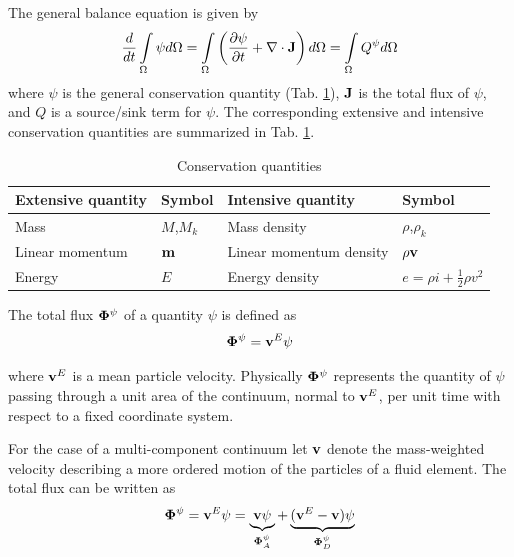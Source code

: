 The general balance equation is given by
%
\begin{eqnarray}
\frac{d}{dt} \int\limits_\Omega \psi d\Omega
=
\int\limits_\Omega
\left(
\frac{\partial\psi}{\partial t}
+
\nabla \cdot {\bf J}
\right)
d\Omega
=
\int\limits_\Omega Q^\psi d\Omega
\end{eqnarray}
%
where $\psi$ is the general conservation quantity (Tab. \ref{tab:conservation_quantities}), $\bf J$ is the total flux of $\psi$, and $Q$ is a source/sink term for $\psi$.
%
The corresponding extensive and intensive conservation quantities are summarized in Tab. \ref{tab:conservation_quantities}.

%
\begin{table}[htb!]
\caption{Conservation quantities}
\label{tab:conservation_quantities}
\begin{center}
\begin{tabular}{|ll|ll|}
\hline
Extensive  quantity &  Symbol    &  Intensive quantity      &  Symbol  \\
\hline \hline
Mass                &  $M$,$M_k$ & Mass density             & $\rho$,$\rho_k$  \\
Linear momentum     &  $\bf m$   & Linear momentum density  & $\rho \bf v$ \\
Energy              &  $E$       & Energy density           & $e = \rho i + \frac 1 2 \rho v^2 $
\\[1pt]
\hline
\end{tabular}
\end{center}
\end{table}
%

The total flux ${\bf\Phi}^\psi$ of a quantity $\psi$ is defined as
\begin{eqnarray}
{\bf\Phi}^\psi
=
{\bf v}^E \psi
\end{eqnarray}

where ${\bf v}^E$ is a mean particle velocity. Physically ${\bf\Phi}^\psi$ represents the quantity of
$\psi$ passing through a unit area of the continuum, normal to
${\bf v}^E$, per unit time with respect to a fixed coordinate
system.

For the case of a multi-component continuum let ${\bf v}$ denote
the mass-weighted velocity
describing a more ordered motion of the particles of a fluid
element. The total flux can be written as
\begin{eqnarray}
{\bf\Phi}^\psi
=
{\bf v}^E \psi
=
\underbrace{{\bf v} \psi}_{{\bf\Phi}^\psi_A}
+
\underbrace{({\bf v}^E-{\bf v}) \psi}_{{\bf\Phi}^\psi_D}
\end{eqnarray}

